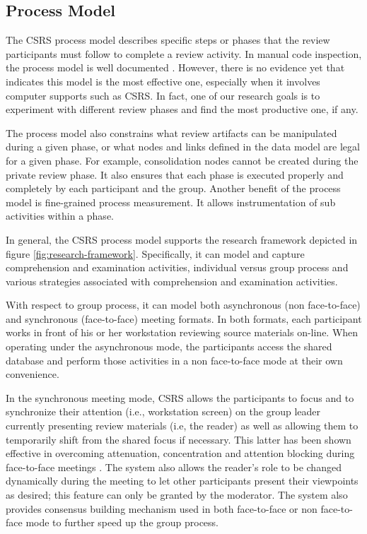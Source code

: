 \subsection {Process Model}
The CSRS process model describes specific steps or phases that the
review participants must follow to complete a review activity.  In
manual code inspection, the process model is well documented
\cite{Fagan76}. However, there is no evidence yet that indicates this
model is the most effective one, especially when it involves computer
supports such as CSRS.  In fact, one of our research goals is to
experiment with different review phases and find the most productive
one, if any.

The process model also constrains what review artifacts can be
manipulated during a given phase, or what nodes and links defined in
the data model are legal for a given phase.  For example,
consolidation nodes cannot be created during the private review phase.
It also ensures that each phase is executed properly and completely by
each participant and the group.  Another benefit of the process model
is fine-grained process measurement.  It allows instrumentation of sub
activities within a phase.

In general, the CSRS process model supports the research framework
depicted in figure \ref{fig:research-framework}.  Specifically, it can
model and capture comprehension and examination activities, individual
versus group process and various strategies associated with
comprehension and examination activities.

With respect to group process, it can model both asynchronous (non
face-to-face) and synchronous (face-to-face) meeting formats. In both
formats, each participant works in front of his or her workstation
reviewing source materials on-line.  When operating under the
asynchronous mode, the participants access the shared database and
perform those activities in a non face-to-face mode at their own
convenience.

In the synchronous meeting mode, CSRS allows the participants to focus
and to synchronize their attention (i.e., workstation screen) on the
group leader currently presenting review materials (i.e, the reader)
as well as allowing them to temporarily shift from the shared focus if
necessary.  This latter has been shown effective in overcoming
attenuation, concentration and attention blocking during face-to-face
meetings \cite{Nunamaker91}.  The system also allows the reader's role
to be changed dynamically during the meeting to let other participants
present their viewpoints as desired; this feature can only be granted
by the moderator.  The system also provides consensus building
mechanism used in both face-to-face or non face-to-face mode to
further speed up the group process.

